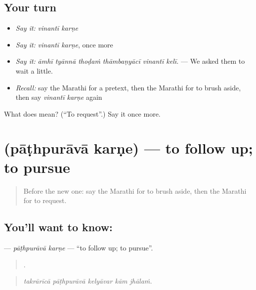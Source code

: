 \subsection*{Your turn}
\begin{itemize}
\raggedright
  \item \emph{Say it:} \emph{vinantī karṇe}
  \item \emph{Say it:} \emph{vinantī karṇe}, once more
  \item \emph{Say it:} \emph{āmhī tyānnā thoḍaṁ thāmbaṇyācī vinantī kelī.} — We asked them to wait a little.
  \item \emph{Recall:} say the Marathi for a pretext, then the Marathi for to brush aside, then say \emph{vinantī karṇe} again
\end{itemize}

\begin{tcolorbox}[breakable,colback=teal!4,colframe=teal!35!black,title={Before you move on}]
What does   mean? (\textquotedblleft{}To request\textquotedblright{}.) Say it once more.
\end{tcolorbox}
\section[\texorpdfstring{\mr{पाठपुरावा} \mr{करणे} (pāṭhpurāvā karṇe)}{पाठपुरावा करणे (pāṭhpurāvā karṇe)}]{  (pāṭhpurāvā karṇe) — to follow up; to pursue}

\label{lesson:MR-C393-pathpurava-karne}



\begin{quote}
Before the new one: say the Marathi for to brush aside, then the Marathi for to request.
\end{quote}

\subsection*{You'll want to know:  }
\textbf{ } — \emph{pāṭhpurāvā karṇe} — \textquotedblleft{}to follow up; to pursue\textquotedblright{}.

\begin{quote}
    .
\end{quote}

\begin{quote}
\emph{takrārīcā pāṭhpurāvā kelyāvar kām jhālaṁ.}
\end{quote}

